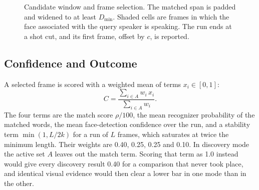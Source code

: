 \documentclass[conference]{IEEEtran}
\begin{document}
\begin{figure}[t]
\centering
{}
\caption{Candidate window and frame selection. The matched span is padded and widened to at least $D_{\min}$. Shaded cells are frames in which the face associated with the query speaker is speaking. The run ends at a shot cut, and its first frame, offset by $c$, is reported.}
\label{fig:window}
\end{figure}

\subsection{Confidence and Outcome}
A selected frame is scored with a weighted mean of terms $x_i\in[0,1]$:
\begin{equation}
C=\frac{\sum_{i\in A} w_i\,x_i}{\sum_{i\in A} w_i}.
\label{eq:conf}
\end{equation}
The four terms are the match score $\rho/100$, the mean recognizer probability of the matched words, the mean face-detection confidence over the run, and a stability term $\min(1, L/2k)$ for a run of $L$ frames, which saturates at twice the minimum length. Their weights are 0.40, 0.25, 0.25 and 0.10. In discovery mode the active set $A$ leaves out the match term. Scoring that term as 1.0 instead would give every discovery result 0.40 for a comparison that never took place, and identical visual evidence would then clear a lower bar in one mode than in the other.
\end{document}
